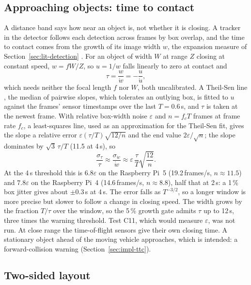 \subsection{Approaching objects: time to contact}
\label{sec:ttc}

A distance band says how near an object is, not whether it is closing. A tracker in the detector follows each detection across frames by box overlap, and the time to contact comes from the growth of its image width $w$, the expansion measure of Section~\ref{sec:lit-detection} \cite{lee1976tau,dagan2004fcw}. For an object of width $W$ at range $Z$ closing at constant speed, $w = fW/Z$, so $u = 1/w$ falls linearly to zero at contact and
\begin{equation}
\tau = \frac{w}{\dot w} = -\frac{u}{\dot u},
\label{eq:ttc}
\end{equation}
which needs neither the focal length $f$ nor $W$, both uncalibrated. A Theil-Sen line \cite{sen1968}, the median of pairwise slopes, which tolerates an outlying box, is fitted to $u$ against the frames' sensor timestamps over the last $T = 0.6$\,s, and $\tau$ is taken at the newest frame. With relative box-width noise $\varepsilon$ and $n = f_c T$ frames at frame rate $f_c$, a least-squares line, used as an approximation for the Theil-Sen fit, gives the slope a relative error $\varepsilon (\tau/T)\sqrt{12/n}$ and the end value $2\varepsilon/\sqrt{n}$; the slope dominates by $\sqrt{3}\,\tau/T$ (11.5 at 4\,s), so
\begin{equation}
\frac{\sigma_\tau}{\tau} \approx \frac{\sigma_{\dot w}}{\dot w} \approx \varepsilon\,\frac{\tau}{T}\sqrt{\frac{12}{n}}.
\label{eq:ttc-error}
\end{equation}
At the 4\,s threshold this is $6.8\varepsilon$ on the Raspberry Pi~5 (19.2\,frames/s, $n \approx 11.5$) and $7.8\varepsilon$ on the Raspberry Pi~4 (14.6\,frames/s, $n \approx 8.8$), half that at 2\,s: a 1\,\% box jitter gives about $\pm 0.3$\,s at 4\,s. The error falls as $T^{-3/2}$, so a longer window is more precise but slower to follow a change in closing speed. The width grows by the fraction $T/\tau$ over the window, so the 5\,\% growth gate admits $\tau$ up to 12\,s, three times the warning threshold. Test C11, which would measure $\varepsilon$, was not run. At close range the time-of-flight sensors give their own closing time. A stationary object ahead of the moving vehicle approaches, which is intended: a forward-collision warning (Section~\ref{sec:impl-ttc}).

\subsection{Two-sided layout}
\label{sec:two-sided}

